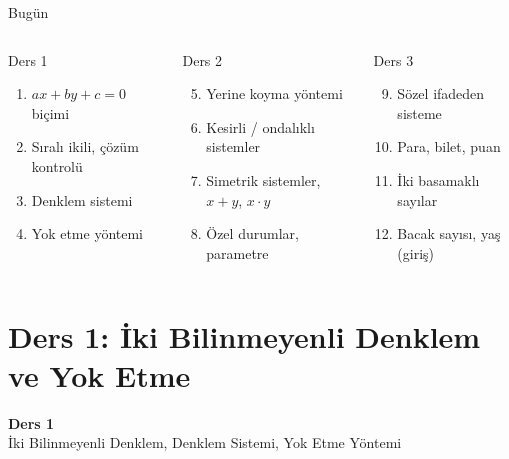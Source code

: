 \documentclass[aspectratio=169,11pt,handout]{beamer}
\begin{document}
\begin{frame}{Bugün}
\begin{columns}[t]
\begin{block}{Ders 1}
\begin{enumerate}
\item \(ax+by+c=0\) biçimi
\item Sıralı ikili, çözüm kontrolü
\item Denklem sistemi
\item Yok etme yöntemi
\end{enumerate}
\end{block}
\begin{block}{Ders 2}
\begin{enumerate}\setcounter{enumi}{4}
\item Yerine koyma yöntemi
\item Kesirli / ondalıklı sistemler
\item Simetrik sistemler, \(x+y\), \(x\cdot y\)
\item Özel durumlar, parametre
\end{enumerate}
\end{block}
\begin{block}{Ders 3}
\begin{enumerate}\setcounter{enumi}{8}
\item Sözel ifadeden sisteme
\item Para, bilet, puan
\item İki basamaklı sayılar
\item Bacak sayısı, yaş (giriş)
\end{enumerate}
\end{block}
\end{columns}
\end{frame}

\section{Ders 1: İki Bilinmeyenli Denklem ve Yok Etme}
\begin{frame}
\centering\Large\color{anamavi}\textbf{Ders 1}\\[6pt]\normalsize İki Bilinmeyenli Denklem, Denklem Sistemi, Yok Etme Yöntemi
\end{frame}
\end{document}
